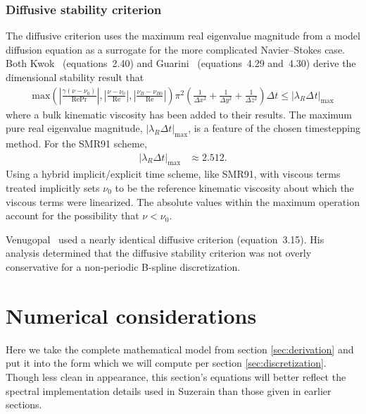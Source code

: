 \documentclass[letterpaper,11pt,nointlimits,reqno,draft]{amsart}
\begin{document}
\subsubsection{Diffusive stability criterion}

The diffusive criterion uses the maximum real eigenvalue magnitude from a model
diffusion equation as a surrogate for the more complicated Navier--Stokes case.
Both Kwok~\cite{Kwok2002} (equations~2.40) and Guarini~\cite{Guarini1998}
(equations~4.29 and~4.30) derive the dimensional stability result that
\begin{align}\label{eq:diffusivestability}
    \mbox{max}\!\left(
      \left|\frac{\gamma\left(\nu-\nu_{0}\right)}{\mbox{Re}\mbox{Pr}}\right|,
      \left|\frac{\nu-\nu_{0}}{\mbox{Re}}\right|,
      \left|\frac{\nu_{B}-\nu_{B0}}{\mbox{Re}}\right|
    \right)
    \pi^{2}
    \left(
        \frac{1}{\Delta{}x^{2}}
      + \frac{1}{\Delta{}y^{2}}
      + \frac{1}{\Delta{}z^{2}}
    \right)
    \Delta{}t \leq \left|\lambda_{R}\Delta_{}t\right|_{\mbox{max}}
\end{align}
where a bulk kinematic viscosity has been added to their results.  The maximum
pure real eigenvalue magnitude,
$\left|\lambda_{R}\Delta{}t\right|_{\mbox{max}}$, is a feature of the chosen
timestepping method.  For the SMR91 scheme,
\begin{align}
\left|\lambda_{R}\Delta{}t\right|_{\mbox{max}} &\approx 2.512.
\end{align}
Using a hybrid implicit/explicit time scheme, like SMR91, with viscous terms
treated implicitly sets $\nu_0$ to be the reference kinematic viscosity
about which the viscous terms were linearized.  The absolute values within the
maximum operation account for the possibility that $\nu<\nu_{0}$.

Venugopal~\cite{Venugopal2003} used a nearly identical diffusive criterion
(equation~3.15).  His analysis determined that the diffusive stability
criterion was not overly conservative for a non-periodic B-spline
discretization.

\section{Numerical considerations}

Here we take the complete mathematical model from section \ref{sec:derivation}
and put it into the form which we will compute per section
\ref{sec:discretization}.  Though less clean in appearance, this section's
equations will better reflect the spectral implementation details used in
Suzerain than those given in earlier sections.
\end{document}

